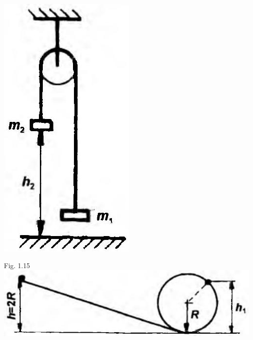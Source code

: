 \documentclass[10pt]{article}
\begin{document}
\includegraphics[max width=\textwidth, center]{2025_07_01_5b3ff9fa0d508c8e9f17g-042}

Fig. 1.15\\
\includegraphics[max width=\textwidth, center]{2025_07_01_5b3ff9fa0d508c8e9f17g-042(1)}
\end{document}
